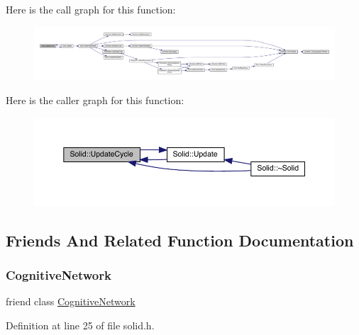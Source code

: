 Here is the call graph for this function\+:
\nopagebreak
\begin{figure}[H]
\begin{center}
\leavevmode
\includegraphics[width=350pt]{class_solid_a17239817eba0e5870454311857dca736_cgraph}
\end{center}
\end{figure}
Here is the caller graph for this function\+:
\nopagebreak
\begin{figure}[H]
\begin{center}
\leavevmode
\includegraphics[width=350pt]{class_solid_a17239817eba0e5870454311857dca736_icgraph}
\end{center}
\end{figure}


\subsection{Friends And Related Function Documentation}
\mbox{\label{class_solid_ad04bbaef84caa0d408ec09a1c1302f5f}} 
\subsubsection{\texorpdfstring{Cognitive\+Network}{CognitiveNetwork}}
{\footnotesize\ttfamily friend class \hyperlink{class_cognitive_network}{Cognitive\+Network}\hspace{0.3cm}{\ttfamily [friend]}}



Definition at line 25 of file solid.\+h.

\mbox{\label{class_solid_ac790db405644a01723104c3c0c8128bb}} 
